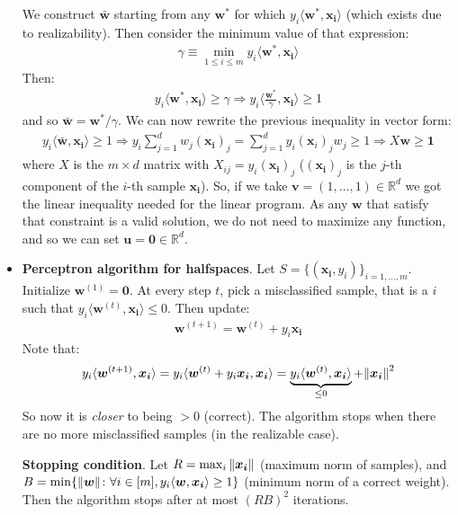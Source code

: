 \documentclass[../template.tex]{subfiles}
\begin{document}
\begin{itemize}
We construct $\bar{\bm{w}}$ starting from any $\bm{w^*}$ for which $y_i \langle \bm{w^*}, \bm{x_i} \rangle$ (which exists due to realizability). Then consider the minimum value of that expression:
\begin{align*}
    \gamma \equiv \min_{1 \leq i \leq m} y_i \langle \bm{w^*}, \bm{x_i} \rangle
\end{align*}
Then:
\begin{align*}
    y_i \langle \bm{w^*}, \bm{x_i} \rangle \geq \gamma  \Rightarrow y_i \langle \frac{\bm{w^*}}{\gamma}, \bm{x_i}  \rangle \geq 1
\end{align*}
and so $\bar{\bm{w}} = \bm{w^*}/\gamma$. We can now rewrite the previous inequality in vector form:
\begin{align*}
    y_i \langle \bar{\bm{w}}, \bm{x_i} \rangle \geq 1 \Rightarrow y_i \sum_{j=1}^d w_j (\bm{x_i})_j = \sum_{j=1}^d y_i (\bm{x}_i)_j w_j \geq 1 \Rightarrow X \bm{w} \geq \bm{1} 
\end{align*}
where $X$ is the $m\times d$ matrix with $X_{ij} = y_i (\bm{x_i})_j$ ($(\bm{x_i})_j$ is the $j$-th component of the $i$-th sample $\bm{x_i}$). So, if we take $\bm{v} = (1,\dots,1)\in \mathbb{R}^d$ we got the linear inequality needed for the linear program. As any $\bm{w}$ that satisfy that constraint is a valid solution, we do not need to maximize any function, and so we can set $\bm{u} = \bm{0} \in \mathbb{R}^d$.

\item \textbf{Perceptron algorithm for halfspaces}. Let $S=\{(\bm{x_i}, y_i)\}_{i=1,\dots,m}$. Initialize $\bm{w}^{(1)} = \bm{0}$.
At every step $t$, pick a misclassified sample, that is a $i$ such that $y_i \langle \bm{w}^{(t)}, \bm{x_i} \rangle \leq 0$. Then update:
\begin{align*}
    \bm{w}^{(t+1)} = \bm{w}^{(t)} + y_i \bm{x_i}
\end{align*} 
Note that:
\begin{align*}
    y_i \langle \bm{w}^{(t+1)}, \bm{x_i} \rangle = y_i \langle  \bm{w}^{(t)} + y_i \bm{x_i}, \bm{x_i} \rangle = \underbrace{y_i \langle  \bm{w}^{(t)}, \bm{x_i} \rangle}_{\leq 0} + \norm{\bm{x_i}}^2
\end{align*}
So now it is \textit{closer} to being $>0$ (correct). The algorithm stops when there are no more misclassified samples (in the realizable case).

\textbf{Stopping condition}. Let $R = \max_i \norm{\bm{x_i}}$ (maximum norm of samples), and $B=\min\{\norm{\bm{w}} \colon \forall i \in [m], y_i \langle \bm{w}, \bm{x_i} \rangle \geq 1\}$ (minimum norm of a correct weight). Then the algorithm stops after at most $(RB)^2$ iterations.
\medskip


\end{itemize}
\end{document}
